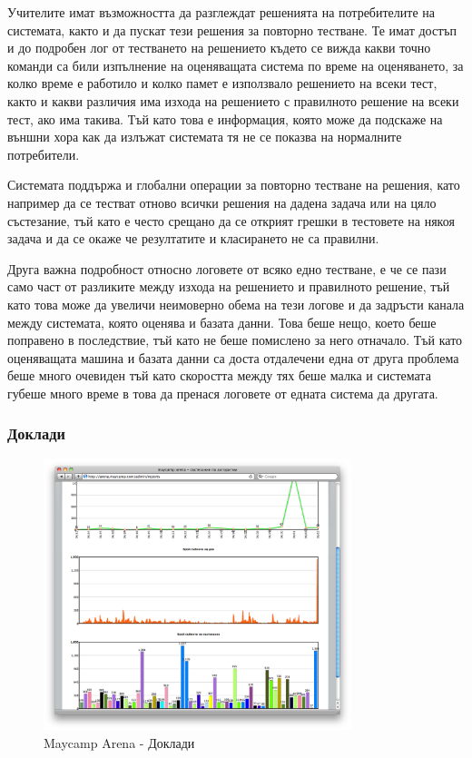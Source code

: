 \documentclass[a4paper,12pt]{article}
\begin{document}
  Учителите имат възможността да разглеждат решенията на потребителите на системата, както и да пускат тези решения за повторно тестване. Те имат достъп и до подробен лог от тестването на решението където се вижда какви точно команди са били изпълнение на оценяващата система по време на оценяването, за колко време е работило и колко памет е използвало решението на всеки тест, както и какви различия има изхода на решението с правилното решение на всеки тест, ако има такива. Тъй като това е информация, която може да подскаже на външни хора как да излъжат системата тя не се показва на нормалните потребители.
  
  Системата поддържа и глобални операции за повторно тестване на решения, като например да се тестват отново всички решения на дадена задача или на цяло състезание, тъй като е често срещано да се открият грешки в тестовете на някоя задача и да се окаже че резултатите и класирането не са правилни.
  
  Друга важна подробност относно логовете от всяко едно тестване, е че се пази само част от разликите между изхода на решението и правилното решение, тъй като това може да увеличи неимоверно обема на тези логове и да задръсти канала между системата, която оценява и базата данни. Това беше нещо, което беше поправено в последствие, тъй като не беше помислено за него отначало. Тъй като оценяващата машина и базата данни са доста отдалечени една от друга проблема беше много очевиден тъй като скоростта между тях беше малка и системата губеше много време в това да пренася логовете от едната система да другата.
  
  \subsubsection{Доклади}

  \begin{figure}[ht]
    \begin{center}
      \includegraphics[width=0.8\textwidth]{maycamp_arena_reports.png}
    \end{center}
    \caption{Maycamp Arena - Доклади}
    \label{arena_reports}
  \end{figure}
  
\end{document}
